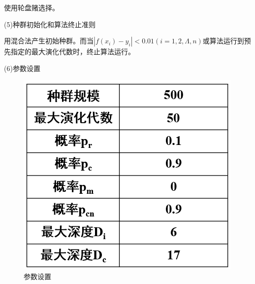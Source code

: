 \documentclass[UTF8]{ctexart}
\begin{document}
使用轮盘赌选择。

(5)种群初始化和算法终止准则

用混合法产生初始种群。而当$|f(x_{i})-y_{i}|<0.01(i=1,2,\Lambda,n)$或算法运行到预先指定的最大演化代数时，终止算法运行。

\newpage
(6)参数设置
    \begin{figure}[ht]
    	\centering	
	   \includegraphics[scale=0.45]{images/parameter.png}   
	   \caption{参数设置}
	   \label{fig:label}
    \end{figure}
\end{document}
